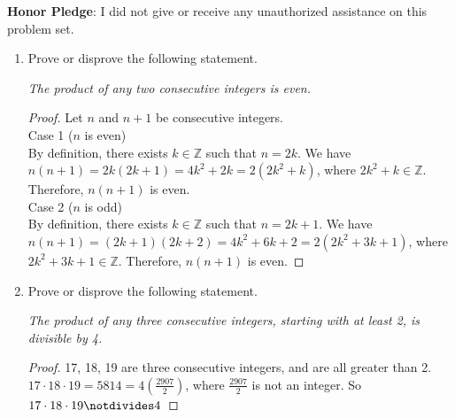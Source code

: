 \documentclass[12pt]{amsart}
\begin{document}
\vfill
\noindent
\textbf{Honor Pledge}: I did not give or receive any unauthorized assistance on this problem set.

\vspace{0.5in}
\hfill\makebox[3.0in]{\hrulefill}

\hfill{}

\newpage
\begin{enumerate}[{\bfseries 1.}]
\item Prove or disprove the following statement.

	\vspace{0.1in}
	\begin{center}
	\noindent
	\textit{The product of any two consecutive integers is even.}
	\end{center}
	\begin{normalize}
	\vspace{0.1in}
    	\begin{proof}
    	Let $n$ and $n+1$ be consecutive integers. 
    	\\Case 1 ($n$ is even)
    	\\By definition, there exists $k\in\mathbb{Z}$ such that $n = 2k$. We have $n(n+1) = 2k(2k+1) = 4k^2 + 2k = 2(2k^2 + k)$, where $2k^2+k \in\mathbb{Z}$. Therefore, $n(n+1)$ is even.
    	\\Case 2 ($n$ is odd)
    	\\By definition, there exists $k\in\mathbb{Z}$ such that $n = 2k+1$. We have $n(n+1) = (2k+1)(2k+2) = 4k^2 + 6k + 2 = 2(2k^2+3k+1)$, where $2k^2+3k+1\in\mathbb{Z}$. Therefore, $n(n+1)$ is even. 
    	\end{proof}
	\end{normalize}
\vspace{0.2in}
\item Prove or disprove the following statement.

	\vspace{0.1in}
	\begin{center}
	\noindent
	\textit{The product of any three consecutive integers, starting with at least 2, is divisible by 4.}
	\end{center}
	\begin{normalize}
	    \vspace{0.1in}
	    \begin{proof}
	    17, 18, 19 are three consecutive integers, and are all greater than 2. 
	    \\$17\cdot 18\cdot 19 = 5814 = 4(\frac{2907}{2})$, where $\frac{2907}{2}$ is not an integer. So $17\cdot 18\cdot 19\notdivides 4$
	    \end{proof}
	\end{normalize}
\end{enumerate}
\end{document}
